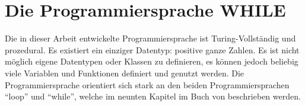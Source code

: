 \chapter{Die Programmiersprache WHILE}

Die in dieser Arbeit entwickelte Programmiersprache ist Turing-Vollständig und prozedural. Es existiert ein einziger Datentyp: positive ganze Zahlen. Es ist nicht möglich eigene Datentypen oder Klassen zu definieren, es können jedoch beliebig viele Variablen und Funktionen definiert und genutzt werden. Die Programmiersprache orientiert sich stark an den beiden Programmiersprachen \enquote{loop} und \enquote{while}, welche im neunten Kapitel im Buch  von \citeauthor{GottfriedVossen2016} beschrieben werden. \cite{GottfriedVossen2016} 


